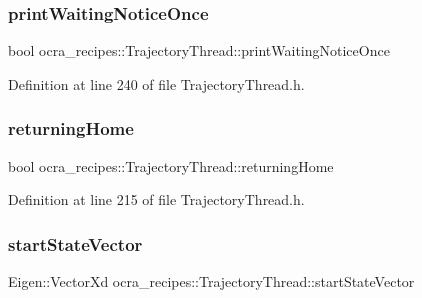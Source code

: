 \hypertarget{classocra__recipes_1_1TrajectoryThread_a4dbc25516ce41a0bc82c49e004a1b933}{}\label{classocra__recipes_1_1TrajectoryThread_a4dbc25516ce41a0bc82c49e004a1b933} 
\subsubsection{\texorpdfstring{print\+Waiting\+Notice\+Once}{printWaitingNoticeOnce}}
{\footnotesize\ttfamily bool ocra\+\_\+recipes\+::\+Trajectory\+Thread\+::print\+Waiting\+Notice\+Once\hspace{0.3cm}{\ttfamily [protected]}}



Definition at line 240 of file Trajectory\+Thread.\+h.

\hypertarget{classocra__recipes_1_1TrajectoryThread_a3835f5a143e350d53786d4469fce09f1}{}\label{classocra__recipes_1_1TrajectoryThread_a3835f5a143e350d53786d4469fce09f1} 
\subsubsection{\texorpdfstring{returning\+Home}{returningHome}}
{\footnotesize\ttfamily bool ocra\+\_\+recipes\+::\+Trajectory\+Thread\+::returning\+Home\hspace{0.3cm}{\ttfamily [protected]}}



Definition at line 215 of file Trajectory\+Thread.\+h.

\hypertarget{classocra__recipes_1_1TrajectoryThread_a28661ee4345695282b2a45baf33bd2af}{}\label{classocra__recipes_1_1TrajectoryThread_a28661ee4345695282b2a45baf33bd2af} 
\subsubsection{\texorpdfstring{start\+State\+Vector}{startStateVector}}
{\footnotesize\ttfamily Eigen\+::\+Vector\+Xd ocra\+\_\+recipes\+::\+Trajectory\+Thread\+::start\+State\+Vector\hspace{0.3cm}{\ttfamily [protected]}}



